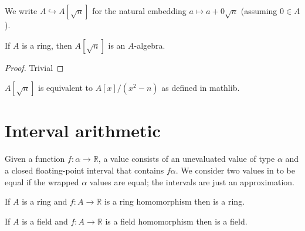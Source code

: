 
\begin{definition}
  \label{def:adjoinOfA}
  \leanok
  We write $A \hookrightarrow A[\sqrt{n}]$ for the natural embedding
  $a \mapsto a + 0\sqrt{n}$ (assuming $0 ∈ A$).
\end{definition}


\begin{lemma}
  \label{thm:adjoinAlgebra}
  \leanok
  If $A$ is a ring, then $A[\sqrt{n}]$ is an $A$-algebra.
\end{lemma}

\begin{proof}
  Trivial
  \leanok
\end{proof}

\begin{lemma}
  \label{thm:mathlibAdjoin}
  $A[\sqrt{n}]$ is equivalent to $A[x] / (x^2 - n)$ as defined in mathlib.
\end{lemma}

\section{Interval arithmetic}

\begin{definition}
  \label{def:filtered}
  \leanok
  Given a function $f : α → ℝ$, a  value consists of
  an unevaluated value of type $α$ and a closed floating-point interval that
  contains $f α$. We consider two values in  to be
  equal if the wrapped $α$ values are equal; the intervals are just an
  approximation.
\end{definition}

\begin{lemma}
  \label{thm:filteredRing}
  \leanok
  If $A$ is a ring and $f : A → ℝ$ is a ring homomorphism then 
  is a ring.
\end{lemma}

\begin{lemma}
  \label{thm:filteredField}
  \leanok
  If $A$ is a field and $f : A → ℝ$ is a field homomorphism then 
  is a field.
\end{lemma}

